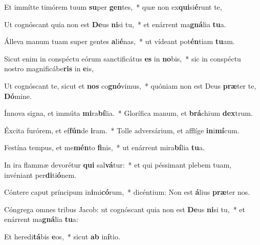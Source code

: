 \item Et immítte timórem tuum \textbf{su}per \textbf{gen}tes,~* quæ non ex\textbf{qui}si\textbf{é}runt te,
\item Ut cognóscant quia non est \textbf{De}us \textbf{ni}si tu,~* et enárrent ma\textbf{gná}lia \textbf{tu}a.
\item Álleva manum tuam super gentes \textbf{a}li\textbf{é}nas,~* ut vídeant pot\textbf{én}tiam \textbf{tu}am.
\item Sicut enim in conspéctu eórum sanctificátus \textbf{es} in \textbf{no}bis,~* sic in conspéctu nostro magnificábe\textbf{ris} in \textbf{e}is,
\item Ut cognóscant te, sicut et \textbf{nos} co\textbf{gnó}vimus,~* quóniam non est Deus \textbf{præ}ter te, \textbf{Dó}mine.
\item Ínnova signa, et immúta \textbf{mi}ra\textbf{bí}lia.~* Glorífica manum, et \textbf{brá}chium \textbf{dex}trum.
\item Éxcita furórem, et ef\textbf{fún}de \textbf{i}ram.~* Tolle adversárium, et afflíge \textbf{in}i\textbf{mí}cum.
\item Festína tempus, et me\textbf{mén}to \textbf{fi}nis,~* ut enárrent mira\textbf{bí}lia \textbf{tu}a.
\item In ira flammæ devorétur \textbf{qui} sal\textbf{vá}tur:~* et qui péssimant plebem tuam, invéniant per\textbf{di}ti\textbf{ó}nem.
\item Cóntere caput príncipum in\textbf{i}mi\textbf{có}rum,~* dicéntium: Non est \textbf{á}lius \textbf{præ}ter nos.
\item Cóngrega omnes tribus Jacob: ut cognóscant quia non est \textbf{De}us \textbf{ni}si tu,~* et enárrent ma\textbf{gná}lia \textbf{tu}a:
\item Et heredi\textbf{tá}bis \textbf{e}os,~* sicut \textbf{ab} in\textbf{í}tio.
